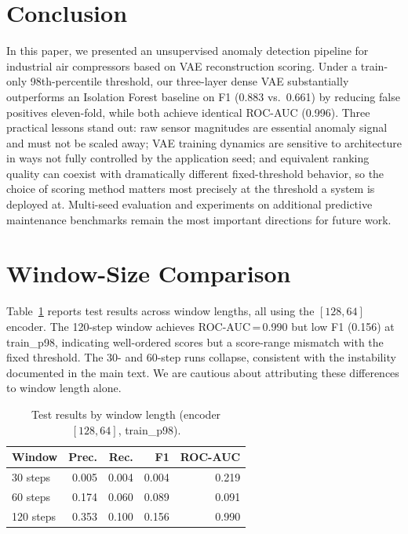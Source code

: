 \documentclass{article}
\newcommand{\hcell}[1]{\textbf{\textcolor{accent!90!black}{#1}}}
\begin{document}
\newpage

\section{Conclusion}

In this paper, we presented an unsupervised anomaly detection pipeline for industrial
air compressors based on VAE reconstruction scoring.
Under a train-only 98th-percentile threshold, our three-layer dense VAE substantially
outperforms an Isolation Forest baseline on F1 (0.883 vs.\ 0.661) by reducing false
positives eleven-fold, while both achieve identical ROC-AUC (0.996).
Three practical lessons stand out: raw sensor magnitudes are essential anomaly signal
and must not be scaled away; VAE training dynamics are sensitive to architecture in
ways not fully controlled by the application seed; and equivalent ranking quality can
coexist with dramatically different fixed-threshold behavior, so the choice of
scoring method matters most precisely at the threshold a system is deployed at.
Multi-seed evaluation and experiments on additional predictive maintenance benchmarks
remain the most important directions for future work.

\clearpage



\newpage
\appendix

\section{Window-Size Comparison}
\label{app:window}

Table~\ref{tab:window} reports test results across window lengths,
all using the $[128, 64]$ encoder.
The 120-step window achieves ROC-AUC\,=\,0.990 but low F1 (0.156) at train\_p98,
indicating well-ordered scores but a score-range mismatch with the fixed threshold.
The 30- and 60-step runs collapse, consistent with the instability documented in
the main text.
We are cautious about attributing these differences to window length alone.

\begin{table}[h]
\centering
\small
\caption{Test results by window length (encoder $[128, 64]$, train\_p98).}
\label{tab:window}
\vspace{3pt}
\begin{tabular}{l r r r r}
\toprule
\rowcolor{tabhead}
\hcell{Window} & \hcell{Prec.} & \hcell{Rec.} & \hcell{F1} & \hcell{ROC-AUC} \\
\midrule
30 steps  & 0.005 & 0.004 & 0.004 & 0.219 \\
\rowcolor{tabalt}
60 steps  & 0.174 & 0.060 & 0.089 & 0.091 \\
120 steps & 0.353 & 0.100 & 0.156 & 0.990 \\
\bottomrule
\end{tabular}
\end{table}
\end{document}
